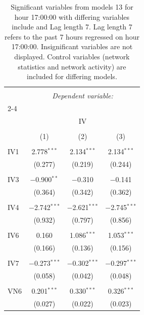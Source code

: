 
\begin{table}[!htbp] \centering 
  \caption{Significant variables from models 13 for hour 17:00:00 with differing variables include 
                               and Lag length 7. Lag length 7 refers to the past 7 hours regressed on hour 17:00:00. 
                               Insignificant variables are not displayed. 
                               Control variables (network statistics and network activity) are 
                               included for differing models.} 
  \label{IVmodels2_t_hourlagged4} 
\scriptsize 
\begin{tabular}{@{\extracolsep{5pt}}lccc} 
\\[-1.8ex]\hline 
\hline \\[-1.8ex] 
 & \multicolumn{3}{c}{\textit{Dependent variable:}} \\ 
\cline{2-4} 
\\[-1.8ex] & \multicolumn{3}{c}{IV} \\ 
\\[-1.8ex] & (1) & (2) & (3)\\ 
\hline \\[-1.8ex] 
 IV1 & 2.778$^{***}$ & 2.134$^{***}$ & 2.134$^{***}$ \\ 
  & (0.277) & (0.219) & (0.244) \\ 
  & & & \\ 
 IV3 & $-$0.900$^{**}$ & $-$0.310 & $-$0.141 \\ 
  & (0.364) & (0.342) & (0.362) \\ 
  & & & \\ 
 IV4 & $-$2.742$^{***}$ & $-$2.621$^{***}$ & $-$2.745$^{***}$ \\ 
  & (0.932) & (0.797) & (0.856) \\ 
  & & & \\ 
 IV6 & 0.160 & 1.086$^{***}$ & 1.053$^{***}$ \\ 
  & (0.166) & (0.136) & (0.156) \\ 
  & & & \\ 
 IV7 & $-$0.273$^{***}$ & $-$0.302$^{***}$ & $-$0.297$^{***}$ \\ 
  & (0.058) & (0.042) & (0.048) \\ 
  & & & \\ 
 VN6 & 0.201$^{***}$ & 0.330$^{***}$ & 0.326$^{***}$ \\ 
  & (0.027) & (0.022) & (0.023) \\ 

\end{tabular}
\end{table}
